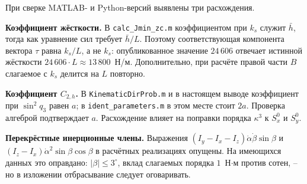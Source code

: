 При сверке MATLAB- и Python-версий выявлены три расхождения.

\textbf{Коэффициент жёсткости.} В \texttt{calc\_Jmin\_zc.m} коэффициентом при $k_s$ служит $\bar{h}$, тогда как уравнение сил требует $\bar{h}/L$. Поэтому соответствующая компонента вектора $\tau$ равна $k_s/L$, а не $k_s$: опубликованное значение $24\,606$ отвечает истинной жёсткости $24\,606\cdot L \approx 13\,800$~Н/м. Дополнительно, при расчёте правой части $B$ слагаемое с $k_s$ делится на $L$ повторно.

\textbf{Коэффициент $C_{2,h}$.} В \texttt{KinematicDirProb.m} и в настоящем выводе коэффициент при $\sin^2{q_3}$ равен $a$; в \texttt{ident\_parameters.m} в этом месте стоит $2a$. Проверка алгеброй подтверждает $a$. Расхождение влияет на поправки порядка $\kappa^3$ к $S^0_x$ и $S^0_y$.

\textbf{Перекрёстные инерционные члены.} Выражения $\left(I_y-I_x-I_z\right)\dot{\alpha}\dot{\beta}\sin{\beta}$ и $\left(I_z-I_x\right)\dot{\alpha}^2\sin{\beta}\cos{\beta}$ в расчётных реализациях опущены. На имеющихся данных это оправдано: $\left|\beta\right| \le 3^{\circ}$, вклад слагаемых порядка $1$~Н$\cdot$м против сотен, -- но в изложении отбрасывание следует оговаривать.
